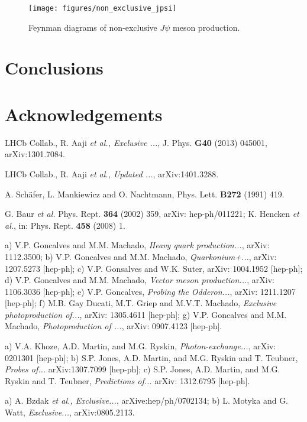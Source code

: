 \documentclass[12pt]{article}
\begin{document}
\begin{figure}[!h]
\centering
 \texttt{[image: figures/non\_exclusive\_jpsi]}
 \caption{Feynman diagrams of non-exclusive $J\psi$ meson production.}
 \label{fig:vmp_non_exlcusive}
\end{figure}

\section{Conclusions}

\section*{Acknowledgements}

\begin{thebibliography}{99}
 LHCb Collab., R. Aaji {\it et al., Exclusive ...}, J. Phys. {\bf G40} (2013) 045001, arXiv:1301.7084.

  LHCb Collab., R. Aaji {\it et al., Updated ...}, arXiv:1401.3288. 

 A. Sch\"afer, L. Mankiewicz and O. Nachtmann, Phys. Lett. {\bf B272} (1991) 419.

 G. Baur {\it et al.} Phys. Rept. {\bf 364} (2002) 359, arXiv: hep-ph/011221; K. Hencken {\it et al.}, in: Phys. Rept. {\bf 458} (2008) 1.

 a) V.P. Goncalves and M.M. Machado, {\it Heavy quark production...}, arXiv: 1112.3500;
b) V.P. Goncalves and M.M. Machado, {\it Quarkonium+...}, arXiv: 1207.5273 [hep-ph]; c) V.P. Gonsalves and W.K. Suter, arXiv: 1004.1952 [hep-ph];
d) V.P. Goncalves and M.M. Machado, {\it Vector meson production...}, arXiv: 1106.3036 [hep-ph]; e) V.P. Goncalves, {\it Probing the Odderon...},
arXiv: 1211.1207 [hep-ph]; f) M.B. Gay Ducati, M.T. Griep and M.V.T. Machado, {\it Exclusive photoproduction of...}, arXiv: 1305.4611 [hep-ph]; 
g) V.P. Goncalves and M.M. Machado, {\it Photoproduction of ...}, arXiv: 0907.4123 [hep-ph].

 a) V.A. Khoze, A.D. Martin, and M.G. Ryskin, {\it Photon-exchange...}, arXiv: 0201301 [hep-ph]; 
b) S.P. Jones, A.D. Martin, and M.G. Ryskin and T. Teubner, {\it Probes of...} arXiv:1307.7099 [hep-ph]; 
c) S.P. Jones, A.D. Martin, and M.G. Ryskin and T. Teubner, {\it Predictions of...} arXiv: 1312.6795 [hep-ph].

 a) A. Bzdak {\it et al., Exclusive...}, arXive:hep/ph/0702134; b) L. Motyka and G. Watt, {\it Exclusive...}, arXiv:0805.2113.  


\end{thebibliography}
\end{document}
